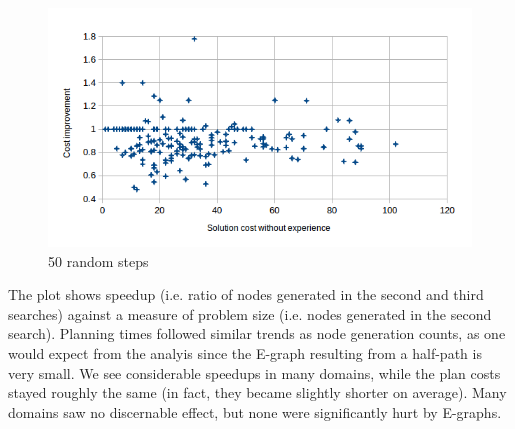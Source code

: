\documentclass[letterpaper]{article}
\begin{document}
\begin{figure}
	\begin{center}
	\includegraphics[scale=0.5]{Cost_100_50.png}
	\end{center}
	\caption{50 random steps}
	 \label{fig:c_100_50}
\end{figure}

The plot shows speedup (i.e. ratio of nodes generated in the second and third searches) against a measure of problem size (i.e. nodes generated in the second search). Planning times followed similar trends as node generation counts, as one would expect from the analyis since the E-graph resulting from a half-path is very small. We see considerable speedups in many domains, while the plan costs stayed roughly the same (in fact, they became slightly shorter on average). Many domains saw no discernable effect, but none were significantly hurt by E-graphs.
\end{document}
